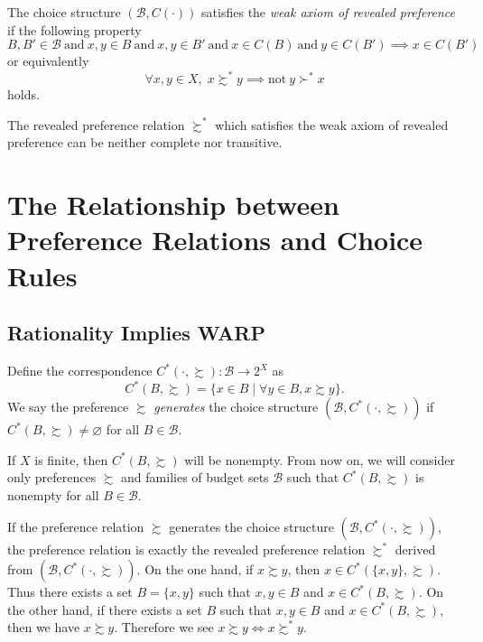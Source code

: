 \documentclass[12pt,fleqn]{book} %
\begin{document}
\begin{definition}
	The choice structure $(\mathcal{B},C(\cdot))$ satisfies the \emph{weak axiom of revealed preference} if the following property
	\[
	B,B'\in \mathcal{B}\ \text{and}\ x,y\in B\ \text{and}\ x,y\in B'\ \text{and}\ x\in C(B)\ \text{and}\ y\in C(B')\implies x\in C(B')
	\]
	or equivalently
	\[
	\forall x,y\in X,\;x\succsim^*y\implies\text{not}\ y\succ^*x
	\]
	holds.
\end{definition}

 The revealed preference relation $\succsim^*$ which satisfies the weak axiom of revealed preference can be neither complete nor transitive.


\section{The Relationship between Preference Relations and Choice Rules }

\subsection{Rationality Implies WARP}
\vspace{4pt}
\begin{definition}
	Define the correspondence $C^*(\cdot,\succsim):\mathcal{B}\rightarrow 2^X$ as 
	\[
	C^*(B,\succsim)=\{x\in B\;|\;\forall y\in B, x\succsim y\}.
	\]
	We say the preference $\succsim$ \emph{generates} the choice structure $(\mathcal{B},C^*(\cdot,\succsim))$ if $C^*(B,\succsim)\ne\varnothing$ for all $B\in\mathcal{B}$.
	
\end{definition}

\begin{remark}
    If $X$ is finite, then $C^*(B,\succsim)$ will be nonempty. From now on, we will consider only preferences $\succsim$ and families of budget sets $\mathcal{B}$ such that $C^*(B,\succsim)$ is nonempty for all $B\in\mathcal{B}$.
\end{remark}

 If the preference relation $\succsim$ generates the choice structure $(\mathcal{B},C^*(\cdot,\succsim))$, the preference relation is exactly the revealed preference relation $\succsim^*$ derived from $(\mathcal{B},C^*(\cdot,\succsim))$. On the one hand, if $x\succsim y$, then $x\in C^*(\{x,y\},\succsim)$. Thus there exists a set $B=\{x,y\}$ such that $x,y\in B$ and $x\in C^*(B,\succsim)$. On the other hand, if there exists a set $B$ such that $x,y\in B$ and $x\in C^*(B,\succsim)$, then we have $x\succsim y$. Therefore we see $x\succsim y\iff x\succsim^* y$.
\end{document}
